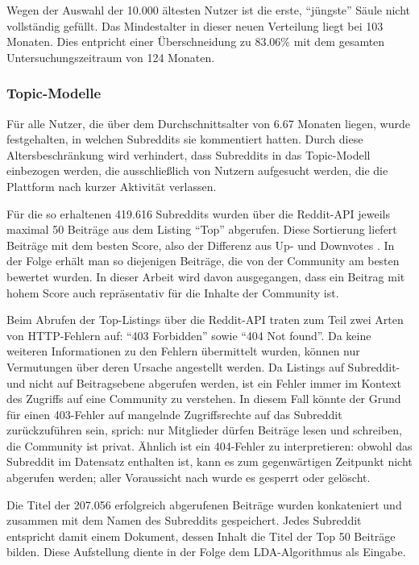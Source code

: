 \documentclass[11pt,a4paper,twoside]{article}
\begin{document}
Wegen der Auswahl der 10.000 ältesten Nutzer ist die erste,
\enquote{jüngste} Säule nicht vollständig gefüllt. Das Mindestalter in
dieser neuen Verteilung liegt bei 103 Monaten. Dies entpricht einer
Überschneidung zu 83.06\% mit dem gesamten Untersuchungszeitraum von 124
Monaten.

\hypertarget{topic-modelle-1}{%
\subsubsection{Topic-Modelle}\label{topic-modelle-1}}

Für alle Nutzer, die über dem Durchschnittsalter von 6.67 Monaten
liegen, wurde festgehalten, in welchen Subreddits sie kommentiert
hatten. Durch diese Altersbeschränkung wird verhindert, dass Subreddits
in das Topic-Modell einbezogen werden, die ausschließlich von Nutzern
aufgesucht werden, die die Plattform nach kurzer Aktivität verlassen.

Für die so erhaltenen 419.616 Subreddits wurden über die Reddit-API
jeweils maximal 50 Beiträge aus dem Listing \enquote{Top} abgerufen.
Diese Sortierung liefert Beiträge mit dem besten Score, also der
Differenz aus Up- und Downvotes \autocite{RedditSrc}. In der Folge
erhält man so diejenigen Beiträge, die von der Community am besten
bewertet wurden. In dieser Arbeit wird davon ausgegangen, dass ein
Beitrag mit hohem Score auch repräsentativ für die Inhalte der Community
ist.

Beim Abrufen der Top-Listings über die Reddit-API traten zum Teil zwei
Arten von HTTP-Fehlern auf: \enquote{403 Forbidden} sowie \enquote{404
Not found}. Da keine weiteren Informationen zu den Fehlern übermittelt
wurden, können nur Vermutungen über deren Ursache angestellt werden. Da
Listings auf Subreddit- und nicht auf Beitragsebene abgerufen werden,
ist ein Fehler immer im Kontext des Zugriffs auf eine Community zu
verstehen. In diesem Fall könnte der Grund für einen 403-Fehler auf
mangelnde Zugriffsrechte auf das Subreddit zurückzuführen sein, sprich:
nur Mitglieder dürfen Beiträge lesen und schreiben, die Community ist
privat. Ähnlich ist ein 404-Fehler zu interpretieren: obwohl das
Subreddit im Datensatz enthalten ist, kann es zum gegenwärtigen
Zeitpunkt nicht abgerufen werden; aller Voraussicht nach wurde es
gesperrt oder gelöscht.

Die Titel der 207.056 erfolgreich abgerufenen Beiträge wurden
konkateniert und zusammen mit dem Namen des Subreddits gespeichert.
Jedes Subreddit entspricht damit einem Dokument, dessen Inhalt die Titel
der Top 50 Beiträge bilden. Diese Aufstellung diente in der Folge dem
LDA-Algorithmus als Eingabe.
\end{document}
